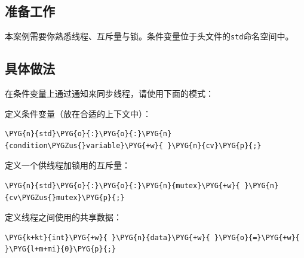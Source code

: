 
\subsection{准备工作}



本案例需要你熟悉线程、互斥量与锁。条件变量位于头文件的\texttt{std}命名空间中。



\subsection{具体做法}



在条件变量上通过通知来同步线程，请使用下面的模式：



定义条件变量（放在合适的上下文中）：



\begin{codeblockbg}
\begin{Verbatim}[commandchars=\\\{\},breaklines=true,breakanywhere=true,fontsize=\codefont,xleftmargin=17bp]
\PYG{n}{std}\PYG{o}{:}\PYG{o}{:}\PYG{n}{condition\PYGZus{}variable}\PYG{+w}{ }\PYG{n}{cv}\PYG{p}{;}
\end{Verbatim}
\end{codeblockbg}



定义一个供线程加锁用的互斥量：



\begin{codeblockbg}
\begin{Verbatim}[commandchars=\\\{\},breaklines=true,breakanywhere=true,fontsize=\codefont,xleftmargin=17bp]
\PYG{n}{std}\PYG{o}{:}\PYG{o}{:}\PYG{n}{mutex}\PYG{+w}{ }\PYG{n}{cv\PYGZus{}mutex}\PYG{p}{;}
\end{Verbatim}
\end{codeblockbg}



定义线程之间使用的共享数据：



\begin{codeblockbg}
\begin{Verbatim}[commandchars=\\\{\},breaklines=true,breakanywhere=true,fontsize=\codefont,xleftmargin=17bp]
\PYG{k+kt}{int}\PYG{+w}{ }\PYG{n}{data}\PYG{+w}{ }\PYG{o}{=}\PYG{+w}{ }\PYG{l+m+mi}{0}\PYG{p}{;}
\end{Verbatim}
\end{codeblockbg}


